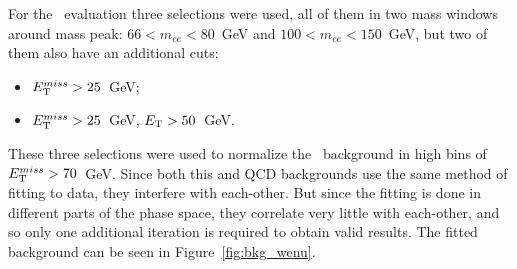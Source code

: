 For the \Wenu\ evaluation three selections were used, all of them in two mass windows around mass peak: $66 < m_{ee} < 80$~GeV and $100 < m_{ee} < 150$~GeV, but two of them also have an additional cuts:
\begin{itemize}
\item $E_{\mathrm{T}}^{miss} > 25$~GeV;
\item $E_{\mathrm{T}}^{miss} > 25$~GeV, $E_{\mathrm{T}} > 50$~GeV.
\end{itemize}
These three selections were used to normalize the \Wenu\ background in high bins of $E_{\mathrm{T}}^{miss} > 70$~GeV. Since both this and QCD backgrounds use the same method of fitting to data, they interfere with each-other. But since the fitting is done in different parts of the phase space, they correlate very little with each-other, and so only one additional iteration is required to obtain valid results. The fitted background can be seen in Figure~\ref{fig:bkg_wenu}.

\begin{figure}
\end{figure}


